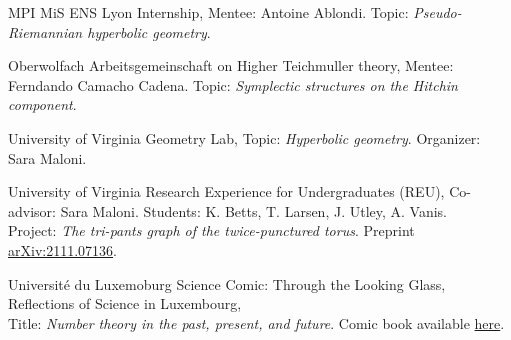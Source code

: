 {MPI MiS}
{ENS Lyon  Internship,}
{Mentee: Antoine Ablondi. Topic: \emph{Pseudo-Riemannian hyperbolic geometry}.}

{Oberwolfach}
{Arbeitsgemeinschaft on Higher Teichmuller theory,}
{Mentee: Ferndando Camacho Cadena. Topic: \emph{Symplectic structures on the Hitchin component}.}

{University of Virginia}
{Geometry Lab,}
{Topic: \emph{Hyperbolic geometry}. Organizer: Sara Maloni.}

{University of Virginia}
{Research Experience for Undergraduates (REU),}
{Co-advisor: Sara Maloni. Students: K. Betts, T. Larsen, J. Utley, A. Vanis. \\Project: \emph{The tri-pants graph of the twice-punctured torus}. Preprint \href{https://arxiv.org/abs/2111.07136}{arXiv:2111.07136}.}

{Universit{\'e} du Luxemoburg}
{Science Comic: Through the Looking Glass, Reflections of Science}
{\vspace{-0.3em}
{\normalsize in Luxembourg,} \\
Title: \emph{Number theory in the past, present, and future}. Comic book available \href{https://www.yumpu.com/en/document/view/62710549/science-comic-through-the-looking-glass-reflections-of-science-in-luxembourg}{here}.}
